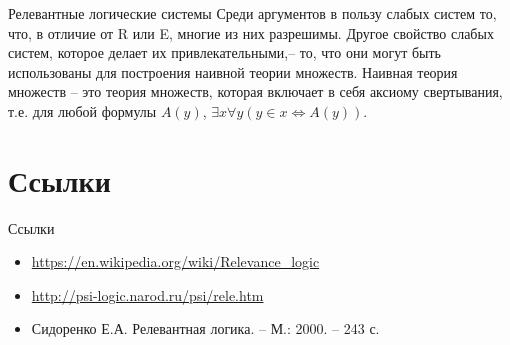 \documentclass[14pt]{beamer}
\begin{document}
\begin{frame}[nologo]{Релевантные логические системы}
Среди аргументов в пользу слабых систем то, что, в отличие от R или E, многие 
из них разрешимы. Другое свойство слабых систем, которое делает их 
привлекательными,-- то, что они могут быть использованы для построения наивной 
теории множеств. Наивная теория множеств -- это теория множеств, которая 
включает в себя аксиому свертывания, т.е. для любой формулы $A(y)$, $\exists x 
\forall y (y \in x \Leftrightarrow A(y))$.
\end{frame}

\section{Ссылки}

\begin{frame}[nologo]{Ссылки}
\begin{itemize}
	\item \url{https://en.wikipedia.org/wiki/Relevance_logic}
	\item \url{http://psi-logic.narod.ru/psi/rele.htm}
	\item Сидоренко Е.А. Релевантная логика. -- М.: 2000. -- 243 с.
\end{itemize}
\end{frame}

\itmothankyou
\end{document}
